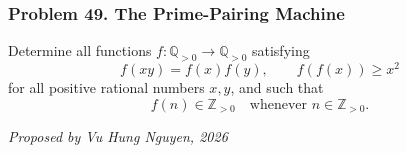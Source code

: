 \subsubsection*{Problem 49. The Prime-Pairing Machine}

\begin{exercisebox}[hard]

Determine all functions $f:\mathbb Q_{>0}\to\mathbb Q_{>0}$ satisfying
\[
\boxed{
f(xy)=f(x)f(y),
\qquad
f(f(x))\ge x^2
}
\]
for all positive rational numbers $x,y$, and such that
\[
\boxed{\qquad f(n)\in\mathbb Z_{>0}\quad\text{whenever }n\in\mathbb Z_{>0}.\qquad}
\]

\begin{flushright}
\textit{Proposed by Vu Hung Nguyen, 2026}
\end{flushright}


\end{exercisebox}

